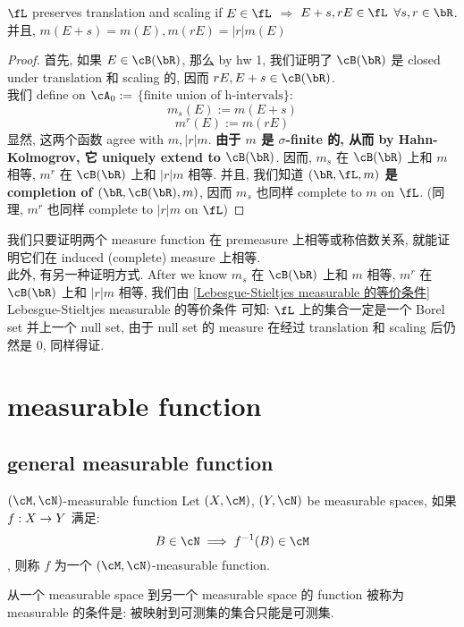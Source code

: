 \documentclass[lang=cn,11pt]{elegantbook}
\begin{document}
\begin{theorem}{$\fL$ preserves translation and scaling}
    if $E \in \fL$ $\Longrightarrow$ $E+s, rE \in \fL$ $\forall s,r \in \bR$.\\
    并且, $m(E+s) = m(E), m(rE) = |r| m(E)$
\end{theorem}
\begin{proof}
首先, 如果 $E \in \cB(\bR)$, 那么 by hw 1, 我们证明了 $\cB(\bR)$ 是 closed under translation 和 scaling 的, 因而 $rE, E+s \in \cB(\bR)$.\\
我们 define on $\cA_0:=$ $\{\text{finite union of h-intervals}\}$:
$$
m_s(E) := m(E+s)
$$
$$
m^r(E) := m(rE)
$$
显然, 这两个函数 agree with $m, |r|m$. \textbf{由于 $m$ 是 $\sigma$-finite 的, 从而 by Hahn-Kolmogrov, 它 uniquely extend to $\cB(\bR)$}. 因而, $m_s$ 在 $\cB(\bR)$ 上和 $m$ 相等, $m^r$ 在 $\cB(\bR)$ 上和 $|r|m$ 相等. 并且, 我们知道\textbf{ $(\bR, \fL, m)$ 是 completion of $(\bR, \cB(\bR),m)$}, 因而 $m_s$ 也同样 complete to $m$ on $\fL$. (同理, $m^r$ 也同样 complete to $|r|m$ on $\fL$)
\end{proof}
\begin{remark}
    我们只要证明两个 measure function 在 premeasure 上相等或称倍数关系, 就能证明它们在 induced (complete) measure 上相等.\\
此外, 有另一种证明方式. After we know $m_s$ 在 $\cB(\bR)$ 上和 $m$ 相等, $m^r$ 在 $\cB(\bR)$ 上和 $|r|m$ 相等, 我们由 \ref{Lebesgue-Stieltjes measurable 的等价条件} Lebesgue-Stieltjes measurable 的等价条件 可知: $\fL$ 上的集合一定是一个 Borel set 并上一个 null set, 由于 null set 的 measure 在经过 translation 和 scaling 后仍然是 0, 同样得证.
 \end{remark}









\chapter{measurable function}
\section{general measurable function}
\begin{definition}{$(\cM, \cN)$-measurable function}
Let $(X,\cM)$, $(Y,\cN)$ be measurable spaces, 如果 $f: X \rightarrow Y$ 满足: $$B \in \cN \implies f^{-1}(B) \in \cM$$, 则称 $f$ 为一个 $(\cM, \cN)$-measurable function.
\end{definition}
从一个 measurable space 到另一个 measurable space 的 function 被称为 measurable 的条件是: 被映射到可测集的集合只能是可测集.
\end{document}
